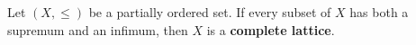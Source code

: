 Let $(X, \leq)$ be a partially ordered set. If every subset of $X$ has both a supremum and an infimum, then $X$ is a \textbf{complete lattice}.
